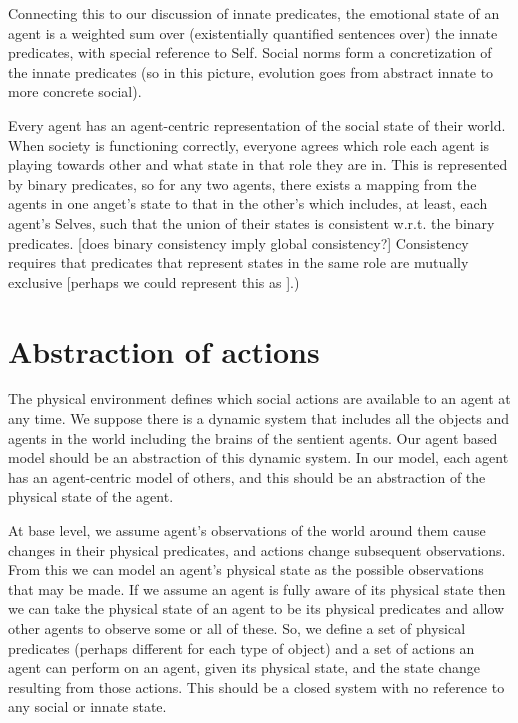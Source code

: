 \documentclass[a4paper]{article}
\begin{document}
Connecting this to our discussion of innate predicates, the emotional state of an agent is a weighted sum over (existentially quantified sentences over) the innate predicates, with special reference to Self. Social norms form a concretization of the innate predicates (so in this picture, evolution goes from abstract innate to more concrete social).

Every agent has an agent-centric representation of the social state of their world. When society is functioning correctly, everyone agrees which role each agent is playing towards other and what state in that role they are in. This is represented by binary predicates, so for any two agents, there exists a mapping from the agents in one anget's state to that in the other's which includes, at least, each agent's Selves, such that the union of their states is consistent w.r.t. the binary predicates. [does binary consistency imply global consistency?] Consistency requires that predicates that represent states in the same role are mutually exclusive [perhaps we could represent this as ].)

\section{Abstraction of actions}

The physical environment defines which social actions are available to an agent at any time. We suppose there is a dynamic system that includes all the objects and agents in the world including the brains of the sentient agents. Our agent based model should be an abstraction of this dynamic system. In our model, each agent has an agent-centric model of others, and this should be an abstraction of the physical state of the agent.

At base level, we assume agent's observations of the world around them cause changes in their physical predicates, and actions change subsequent observations. From this we can model an agent's physical state as the possible observations that may be made. If we assume an agent is fully aware of its physical state then we can take the physical state of an agent to be its physical predicates and allow other agents to observe some or all of these. So, we define a set of physical predicates (perhaps different for each type of object) and a set of actions an agent can perform on an agent, given its physical state, and the state change resulting from those actions. This should be a closed system with no reference to any social or innate state.
\end{document}
